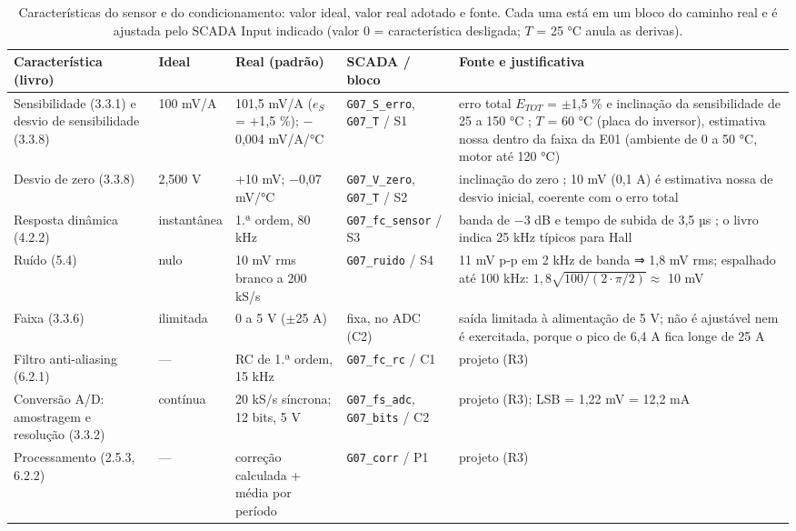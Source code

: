 \documentclass[10pt,a4paper]{article}
\begin{document}
\begin{table}[!htbp]\centering\footnotesize
\caption{Características do sensor e do condicionamento: valor ideal, valor real adotado e fonte. Cada uma está em um bloco do caminho real e é ajustada pelo SCADA Input indicado (valor 0 = característica desligada; $T$ = 25 °C anula as derivas).}\label{tab:car}
\begin{tabularx}{\textwidth}{p{3.0cm}p{1.9cm}p{2.8cm}p{2.3cm}Y}\toprule
Característica (livro) & Ideal & Real (padrão) & SCADA / bloco & Fonte e justificativa\\\midrule
Sensibilidade (3.3.1) e desvio de sensibilidade (3.3.8) & 100 mV/A & 101,5 mV/A ($e_S$ = +1,5 \%); $-$0,004 mV/A/°C & \texttt{G07\_S\_erro}, \texttt{G07\_T} / S1 & erro total $E_{TOT}$ = $\pm$1,5 \% e inclinação da sensibilidade de 25 a 150 °C \cite{acs712}; $T$ = 60 °C (placa do inversor), estimativa nossa dentro da faixa da E01 (ambiente de 0 a 50 °C, motor até 120 °C)\\
Desvio de zero (3.3.8) & 2,500 V & +10 mV; $-$0,07 mV/°C & \texttt{G07\_V\_zero}, \texttt{G07\_T} / S2 & inclinação do zero \cite{acs712}; 10 mV (0,1 A) é estimativa nossa de desvio inicial, coerente com o erro total\\
Resposta dinâmica (4.2.2) & instantânea & 1.ª ordem, 80 kHz & \texttt{G07\_fc\_sensor} / S3 & banda de $-$3 dB e tempo de subida de 3,5 µs \cite{acs712}; o livro indica 25 kHz típicos para Hall \cite{aguirre}\\
Ruído (5.4) & nulo & 10 mV rms branco a 200 kS/s & \texttt{G07\_ruido} / S4 & 11 mV p-p em 2 kHz de banda \cite{acs712} ⇒ 1,8 mV rms; espalhado até 100 kHz: $1{,}8\sqrt{100/(2\cdot\pi/2)}\approx$ 10 mV\\
Faixa (3.3.6) & ilimitada & 0 a 5 V ($\pm$25 A) & fixa, no ADC (C2) & saída limitada à alimentação de 5 V; não é ajustável nem é exercitada, porque o pico de 6,4 A fica longe de 25 A\\
Filtro anti-aliasing (6.2.1) & — & RC de 1.ª ordem, 15 kHz & \texttt{G07\_fc\_rc} / C1 & projeto (R3)\\
Conversão A/D: amostragem e resolução (3.3.2) & contínua & 20 kS/s síncrona; 12 bits, 5 V & \texttt{G07\_fs\_adc}, \texttt{G07\_bits} / C2 & projeto (R3); LSB = 1,22 mV = 12,2 mA\\
Processamento (2.5.3, 6.2.2) & — & correção calculada + média por período & \texttt{G07\_corr} / P1 & projeto (R3)\\\bottomrule
\end{tabularx}
\end{table}
\end{document}
